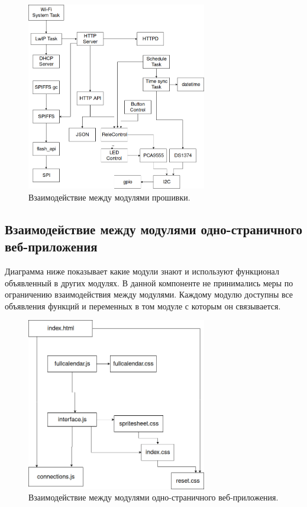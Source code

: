 \begin{figure}[h!]
    \centering
    \includegraphics[width=0.7\textwidth]{firmware_module_hierarchy.png}
    \caption{Взаимодействие между модулями прошивки.}
\end{figure}


\newpage
\subsection{Взаимодействие между модулями одно-страничного веб-приложения}
Диаграмма ниже показывает какие модули знают и используют функционал объявленный в других модулях. В данной компоненте не принимались меры по ограничению взаимодействия между модулями. Каждому модулю доступны все объявления функций и переменных в том модуле с которым он связывается.

\begin{figure}[h!]
    \centering
    \includegraphics[width=0.7\textwidth]{webapp_modules_hierarchy.png}
    \caption{Взаимодействие между модулями одно-страничного веб-приложения.}
\end{figure}


